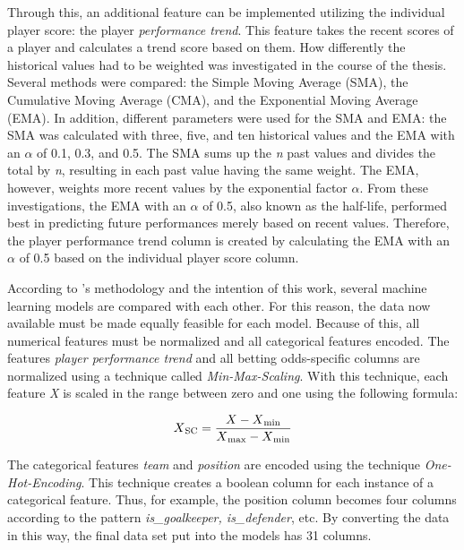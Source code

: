 Through this, an additional feature can be implemented utilizing the individual player score: the player \emph{performance trend}. This feature takes the recent scores of a player and calculates a trend score based on them. How differently the historical values had to be weighted was investigated in the course of the thesis. Several methods were compared: the Simple Moving Average (SMA), the Cumulative Moving Average (CMA), and the Exponential Moving Average (EMA). In addition, different parameters were used for the SMA and EMA: the SMA was calculated with three, five, and ten historical values and the EMA with an $\alpha$ of 0.1, 0.3, and 0.5. The SMA sums up the \emph{n} past values and divides the total by \emph{n}, resulting in each past value having the same weight. The EMA, however, weights more recent values by the exponential factor $\alpha$. From these investigations, the EMA with an $\alpha$ of 0.5, also known as the half-life, performed best in predicting future performances merely based on recent values. Therefore, the player performance trend column is created by calculating the EMA with an $\alpha$ of 0.5 based on the individual player score column.

According to \citeauthor{geron_hands-machine_2019}'s methodology and the intention of this work, several machine learning models are compared with each other. For this reason, the data now available must be made equally feasible for each model. Because of this, all numerical features must be normalized and all categorical features encoded. The features \emph{player performance trend} and all betting odds-specific columns are normalized using a technique called \emph{Min-Max-Scaling}. With this technique, each feature \emph{X} is scaled in the range between zero and one using the following formula:

\begin{equation}
    X\textsubscript{SC} = \frac{X - X\textsubscript{min}}{X\textsubscript{max}- X\textsubscript{min}}
    \label{eq:min_max_scaling}
\end{equation}

The categorical features \emph{team} and \emph{position} are encoded using the technique \emph{One-Hot-Encoding}. This technique creates a boolean column for each instance of a categorical feature. Thus, for example, the position column becomes four columns according to the pattern \emph{is\_goalkeeper, is\_defender}, etc. By converting the data in this way, the final data set put into the models has 31 columns.

